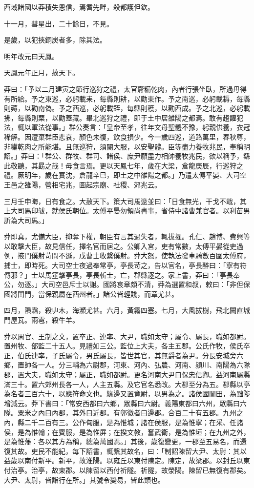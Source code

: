 \begin{pinyinscope}
西域諸國以莽積失恩信，焉耆先畔，殺都護但欽。

十一月，彗星出，二十餘日，不見。

是歲，以犯挾銅炭者多，除其法。

明年改元曰天鳳。

天鳳元年正月，赦天下。

莽曰：「予以二月建寅之節行巡狩之禮，太官齎糒乾肉，內者行張坐臥，所過毋得有所給。予之東巡，必躬載耒，每縣則耕，以勸東作。予之南巡，必躬載耨，每縣則薅，以勸南偽。予之西巡，必躬載銍，每縣則穫，以勸西成。予之北巡，必躬載拂，每縣則粟，以勸蓋藏。畢北巡狩之禮，即于土中居雒陽之都焉。敢有趨讙犯法，輒以軍法從事。」群公奏言：「皇帝至孝，往年文母聖體不豫，躬親供養，衣冠稀解。因遭棄群臣悲哀，顏色未復，飲食損少。今一歲四巡，道路萬里，春秋尊，非糒乾肉之所能堪。且無巡狩，須闋大服，以安聖體。臣等盡力養牧兆民，奉稱明詔。」莽曰：「群公、群牧、群司、諸侯、庶尹願盡力相帥養牧兆民，欲以稱予，繇此敬聽，其勗之哉！毋食言焉。更以天鳳七年，歲在大梁，倉龍庚辰，行巡狩之禮。厥明年，歲在實沈，倉龍辛巳，即土之中雒陽之都。」乃遣太傅平晏、大司空王邑之雒陽，營相宅兆，圖起宗廟、社稷、郊兆云。

三月壬申晦，日有食之。大赦天下。策大司馬逯並曰：「日食無光，干戈不戢，其上大司馬印韍，就侯氏朝位。太傅平晏勿領尚書事，省侍中諸曹兼官者。以利苗男訢為大司馬。」

莽即真，尤備大臣，抑奪下權，朝臣有言其過失者，輒拔擢。孔仁、趙博、費興等以敢擊大臣，故見信任，擇名官而居之。公卿入宮，吏有常數，太傅平晏從吏過例，掖門僕射苛問不遜，戊曹士收繫僕射。莽大怒，使執法發車騎數百圍太傅府，捕士，即時死。大司空士夜過奉常亭，亭長苛之，告以官名，亭長醉曰：「寧有符傳邪？」士以馬箠擊亭長，亭長斬士，亡，郡縣逐之。家上書，莽曰：「亭長奉公，勿逐。」大司空邑斥士以謝。國將哀章頗不清，莽為選置和叔，敕曰：「非但保國將閨門，當保親屬在西州者。」諸公皆輕賤，而章尤甚。

四月，隕霜，殺屮木，海瀕尤甚。六月，黃霧四塞。七月，大風拔樹，飛北闕直城門屋瓦。雨雹，殺牛羊。

莽以周官、王制之文，置卒正、連率、大尹，職如太守；屬令、屬長，職如都尉。置州牧、部監二十五人。見禮如三公。監位上大夫，各主五郡。公氏作牧，侯氏卒正，伯氏連率，子氏屬令，男氏屬長，皆世其官，其無爵者為尹。分長安城旁六鄉，置帥各一人。分三輔為六尉郡，河東、河內、弘農、河南、潁川、南陽為六隊郡，置大夫，職如太守；屬正，職如都尉。更名河南大尹曰保忠信卿。益河南屬縣滿三十。置六郊州長各一人，人主五縣。及它官名悉改。大郡至分為五。郡縣以亭為名者三百六十，以應符命文也。緣邊又置竟尉，以男為之。諸侯國閒田，為黜陟增減云。莽下書曰：「常安西都曰六鄉，眾縣曰六尉。義陽東都曰六州，眾縣曰六隊。粟米之內曰內郡，其外曰近郡。有鄣徼者曰邊郡。合百二十有五郡。九州之內，縣二千二百有三。公作甸服，是為惟城；諸在侯服，是為惟寧；在采、任諸侯，是為惟翰；在賓服，是為惟屏；在揆文教，奮武衛，是為惟垣；在九州之外，是為惟藩：各以其方為稱，總為萬國焉。」其後，歲復變更，一郡至五易名，而還復其故。吏民不能紀，每下詔書，輒繫其故名，曰：「制詔陳留大尹、太尉：其以益歲以南付新平。新平，故淮陽。以雍丘以東付陳定。陳定，故梁郡。以封丘以東付治亭。治亭，故東郡。以陳留以西付祈隧。祈隧，故滎陽。陳留已無復有郡矣。大尹、太尉，皆詣行在所。」其號令變易，皆此類也。


\end{pinyinscope}
